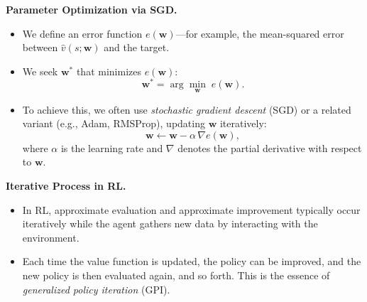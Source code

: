 \noindent
\textbf{Parameter Optimization via SGD.}
\begin{itemize}
    \item We define an error function $e(\boldsymbol{w})$—for example, the mean-squared error 
    between $\hat{v}(s; \boldsymbol{w})$ and the target.
    \item We seek $\boldsymbol{w}^*$ that minimizes $e(\boldsymbol{w})$:
    \[
    \boldsymbol{w}^* 
    = \arg\min_{\boldsymbol{w}} \; e(\boldsymbol{w}).
    \]
    \item To achieve this, we often use \emph{stochastic gradient descent} (SGD) 
    or a related variant (e.g., Adam, RMSProp), updating $\boldsymbol{w}$ iteratively:
    \[
    \boldsymbol{w} \leftarrow \boldsymbol{w} - \alpha \,\nabla e(\boldsymbol{w}),
    \]
    where $\alpha$ is the learning rate and $\nabla$ denotes the partial derivative with respect to $\boldsymbol{w}$.
\end{itemize}

\noindent
\textbf{Iterative Process in RL.}
\begin{itemize}
    \item In RL, approximate evaluation and approximate improvement typically 
    occur iteratively while the agent gathers new data by interacting with the environment.
    \item Each time the value function is updated, the policy can be improved, 
    and the new policy is then evaluated again, and so forth. This is the essence 
    of \emph{generalized policy iteration} (GPI).
\end{itemize}
